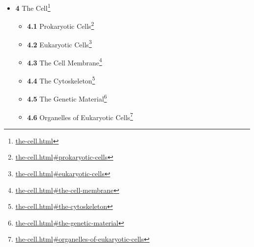 \documentclass[
]{article}
\providecommand{\tightlist}{%
  \setlength{\itemsep}{0pt}\setlength{\parskip}{0pt}}
\providecommand{\tightlist}{%
  \setlength{\itemsep}{0pt}\setlength{\parskip}{0pt}}
\let\rmarkdownfootnote\footnote%
\def\footnote{\protect\rmarkdownfootnote}
\renewcommand{\href}[2]{#2\footnote{\url{#1}}}
\theoremstyle{definition}
\theoremstyle{definition}
\theoremstyle{definition}
\theoremstyle{remark}
\begin{document}
\begin{itemize}
\begin{itemize}
    \begin{itemize}
    \tightlist
    \item
      \href{basic-organic-chemistry-for-biology.html\#structure}{\emph{}\textbf{3.3.1}
      Structure}
    \item
      \href{basic-organic-chemistry-for-biology.html\#cellular-functions-of-proteins}{\emph{}\textbf{3.3.2}
      Cellular Functions of Proteins}
    \item
      \href{basic-organic-chemistry-for-biology.html\#cell-signaling-and-ligand-binding}{\emph{}\textbf{3.3.3}
      Cell Signaling And Ligand Binding}
    \item
      \href{basic-organic-chemistry-for-biology.html\#structural-proteins}{\emph{}\textbf{3.3.4}
      Structural Proteins}
    \end{itemize}
  \item
    \href{basic-organic-chemistry-for-biology.html\#carbohydrates}{\emph{}\textbf{3.4}
    Carbohydrates}
  \item
    \href{basic-organic-chemistry-for-biology.html\#lipids}{\emph{}\textbf{3.5}
    Lipids}
  \item
    \href{basic-organic-chemistry-for-biology.html\#nucleic-acids}{\emph{}\textbf{3.6}
    Nucleic Acids}

    \begin{itemize}
    \tightlist
    \item
      \href{basic-organic-chemistry-for-biology.html\#deoxyribonucleic-acid-dna}{\emph{}\textbf{3.6.1}
      Deoxyribonucleic Acid (DNA)}
    \item
      \href{basic-organic-chemistry-for-biology.html\#ribonucleic-acid-rna}{\emph{}\textbf{3.6.2}
      Ribonucleic Acid (RNA)}
    \end{itemize}
  \end{itemize}
\item
  \href{the-cell.html}{\emph{}\textbf{4} The Cell}

  \begin{itemize}
  \tightlist
  \item
    \href{the-cell.html\#prokaryotic-cells}{\emph{}\textbf{4.1}
    Prokaryotic Cells}
  \item
    \href{the-cell.html\#eukaryotic-cells}{\emph{}\textbf{4.2}
    Eukaryotic Cells}
  \item
    \href{the-cell.html\#the-cell-membrane}{\emph{}\textbf{4.3} The Cell
    Membrane}
  \item
    \href{the-cell.html\#the-cytoskeleton}{\emph{}\textbf{4.4} The
    Cytoskeleton}
  \item
    \href{the-cell.html\#the-genetic-material}{\emph{}\textbf{4.5} The
    Genetic Material}
  \item
    \href{the-cell.html\#organelles-of-eukaryotic-cells}{\emph{}\textbf{4.6}
    Organelles of Eukaryotic Cells}


\end{itemize}
\end{itemize}
\end{document}
